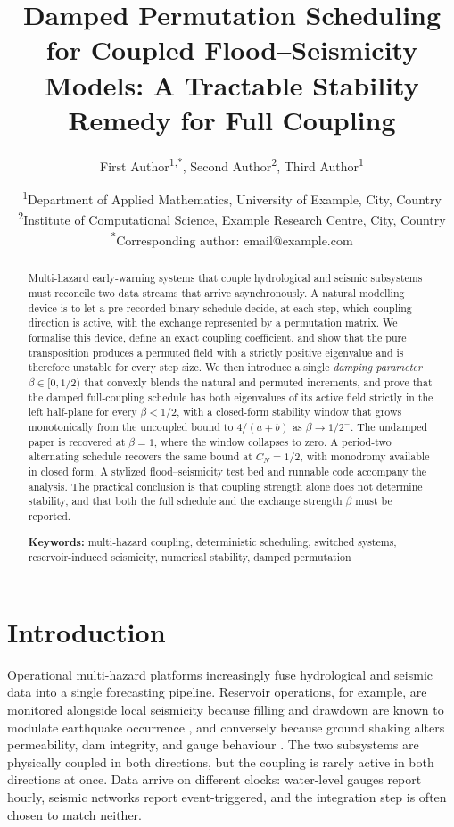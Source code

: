 \documentclass[12pt, a4paper]{article}
\title{\textbf{Damped Permutation Scheduling for Coupled
Flood--Seismicity Models: A Tractable Stability Remedy for Full Coupling}}
\author{
  First Author\textsuperscript{1,*},
  Second Author\textsuperscript{2},
  Third Author\textsuperscript{1}
}
\date{
  \textsuperscript{1}Department of Applied Mathematics, University of Example,
  City, Country \\
  \textsuperscript{2}Institute of Computational Science, Example Research
  Centre, City, Country \\
  \textsuperscript{*}Corresponding author: email@example.com
}
\theoremstyle{plain}
\theoremstyle{definition}
\theoremstyle{remark}
\newcommand{\keywords}[1]{\vspace{0.5em}\noindent\textbf{Keywords:} #1}
\begin{document}
\linenumbers
\maketitle

\begin{abstract}
\noindent
Multi-hazard early-warning systems that couple hydrological and seismic
subsystems must reconcile two data streams that arrive asynchronously. A
natural modelling device is to let a pre-recorded binary schedule decide, at
each step, which coupling direction is active, with the exchange represented
by a permutation matrix. We formalise this device, define an exact coupling
coefficient, and show that the pure transposition produces a permuted field
with a strictly positive eigenvalue and is therefore unstable for every step
size. We then introduce a single \emph{damping parameter} $\beta \in [0, 1/2)$
that convexly blends the natural and permuted increments, and prove that the
damped full-coupling schedule has both eigenvalues of its active field
strictly in the left half-plane for every $\beta < 1/2$, with a closed-form
stability window that grows monotonically from the uncoupled bound to
$4/(a+b)$ as $\beta \to 1/2^-$. The undamped paper is recovered at
$\beta = 1$, where the window collapses to zero. A period-two alternating
schedule recovers the same bound at $C_N = 1/2$, with monodromy available in
closed form. A stylized flood--seismicity test bed and runnable code accompany
the analysis. The practical conclusion is that coupling strength alone does
not determine stability, and that both the full schedule and the exchange
strength $\beta$ must be reported.

\keywords{multi-hazard coupling, deterministic scheduling, switched systems,
reservoir-induced seismicity, numerical stability, damped permutation}
\end{abstract}

\newpage

\section{Introduction}
\label{sec:intro}

Operational multi-hazard platforms increasingly fuse hydrological and seismic
data into a single forecasting pipeline. Reservoir operations, for example,
are monitored alongside local seismicity because filling and drawdown are
known to modulate earthquake occurrence \cite{simpson1976,gupta1992}, and
conversely because ground shaking alters permeability, dam integrity, and
gauge behaviour \cite{scholz1998}. The two subsystems are physically coupled
in both directions, but the coupling is rarely active in both directions at
once. Data arrive on different clocks: water-level gauges report hourly,
seismic networks report event-triggered, and the integration step is often
chosen to match neither.
\end{document}
